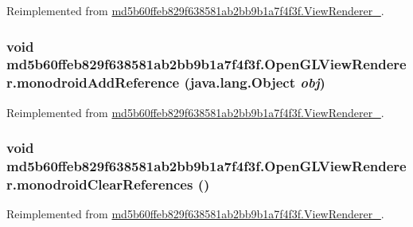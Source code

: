 Reimplemented from \hyperlink{classmd5b60ffeb829f638581ab2bb9b1a7f4f3f_1_1_view_renderer__2_a0898cf56fa9a49b653470eaf1608e77}{md5b60ffeb829f638581ab2bb9b1a7f4f3f.ViewRenderer\_}.\hypertarget{classmd5b60ffeb829f638581ab2bb9b1a7f4f3f_1_1_open_g_l_view_renderer_c8094bbc57aebaa1cd453bac15ea5c5c}{
\subsubsection[{monodroidAddReference}]{\setlength{\rightskip}{0pt plus 5cm}void md5b60ffeb829f638581ab2bb9b1a7f4f3f.OpenGLViewRenderer.monodroidAddReference (java.lang.Object {\em obj})}}
\label{classmd5b60ffeb829f638581ab2bb9b1a7f4f3f_1_1_open_g_l_view_renderer_c8094bbc57aebaa1cd453bac15ea5c5c}




Reimplemented from \hyperlink{classmd5b60ffeb829f638581ab2bb9b1a7f4f3f_1_1_view_renderer__2_64ca8244a89f60a47c173d9c0b15d610}{md5b60ffeb829f638581ab2bb9b1a7f4f3f.ViewRenderer\_}.\hypertarget{classmd5b60ffeb829f638581ab2bb9b1a7f4f3f_1_1_open_g_l_view_renderer_ba5ec714afa8ec3c8390a6881dd96e13}{
\subsubsection[{monodroidClearReferences}]{\setlength{\rightskip}{0pt plus 5cm}void md5b60ffeb829f638581ab2bb9b1a7f4f3f.OpenGLViewRenderer.monodroidClearReferences ()}}
\label{classmd5b60ffeb829f638581ab2bb9b1a7f4f3f_1_1_open_g_l_view_renderer_ba5ec714afa8ec3c8390a6881dd96e13}




Reimplemented from \hyperlink{classmd5b60ffeb829f638581ab2bb9b1a7f4f3f_1_1_view_renderer__2_dae20979ac761a65aa60c9b427509c37}{md5b60ffeb829f638581ab2bb9b1a7f4f3f.ViewRenderer\_}.


